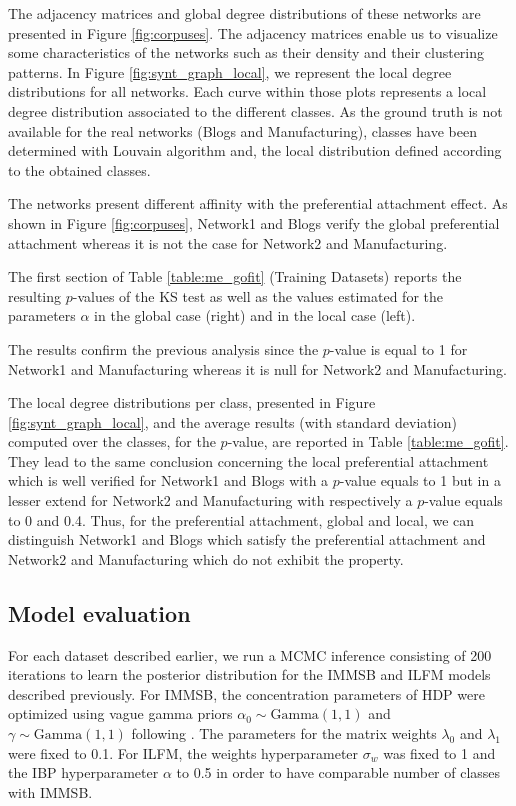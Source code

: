The adjacency matrices and global degree distributions of these networks are presented in Figure \ref{fig:corpuses}. The adjacency matrices enable us to visualize some characteristics of the networks such as their density and their clustering patterns. In Figure \ref{fig:synt_graph_local}, we represent the local degree distributions for all networks. Each curve within those plots represents a local degree distribution associated to the different classes. As the ground truth is not available for the real networks (Blogs and Manufacturing), classes have been determined with Louvain algorithm \cite{Blondel2008} and, the local distribution defined according to the obtained classes. 

The networks present different affinity with the preferential attachment effect.  As shown in Figure \ref{fig:corpuses}, Network1 and Blogs verify the  global preferential attachment whereas it is not the case for Network2 and Manufacturing.

The first section of Table \ref{table:me_gofit} (Training Datasets) reports the resulting $p$-values of the KS test as well as the values estimated for the parameters $\alpha$ in the global case (right) and in the local case (left).

The results confirm the previous analysis since the $p$-value is equal to 1 for Network1 and Manufacturing whereas it is null for Network2 and Manufacturing.

The local degree distributions per class, presented in Figure \ref{fig:synt_graph_local}, and the average results (with standard deviation) computed over the classes, for the $p$-value, are reported in Table \ref{table:me_gofit}. They lead to the same conclusion concerning the local preferential attachment which is well verified for Network1 and Blogs with a $p$-value equals to 1 but in a lesser extend for Network2 and Manufacturing with respectively a $p$-value equals to 0 and 0.4. Thus, for the preferential attachment, global and local, we can distinguish Network1 and Blogs which satisfy the preferential attachment and Network2 and Manufacturing which do not exhibit the property.






\subsection{Model evaluation}
For each dataset described earlier, we run a MCMC inference consisting of 200 iterations to learn the posterior distribution for the IMMSB and ILFM  models described previously. For IMMSB, the concentration parameters of HDP were optimized  using vague gamma priors $\alpha_0 \sim \text{Gamma}(1,1)$ and $\gamma \sim \text{Gamma}(1,1)$ following \cite{HDP}. The parameters for the matrix weights  $\lambda_0$ and $\lambda_1$ were fixed to 0.1. For ILFM, the weights hyperparameter  $\sigma_w$ was fixed to 1 and the IBP hyperparameter $\alpha$ to 0.5 in order to  have comparable number of classes with IMMSB.


